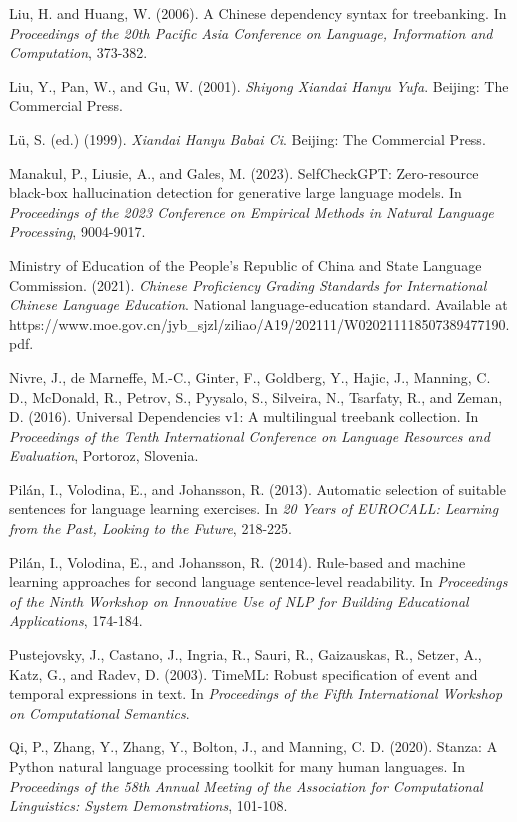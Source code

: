 \documentclass{CUP-JNL-NLP}
\begin{document}
Liu, H. and Huang, W. (2006). A Chinese dependency syntax for treebanking. In \emph{Proceedings of the 20th Pacific Asia Conference on Language, Information and Computation}, 373-382.

Liu, Y., Pan, W., and Gu, W. (2001). \emph{Shiyong Xiandai Hanyu Yufa}. Beijing: The Commercial Press.

Lü, S. (ed.) (1999). \emph{Xiandai Hanyu Babai Ci}. Beijing: The Commercial Press.

Manakul, P., Liusie, A., and Gales, M. (2023). SelfCheckGPT: Zero-resource black-box hallucination detection for generative large language models. In \emph{Proceedings of the 2023 Conference on Empirical Methods in Natural Language Processing}, 9004-9017.

Ministry of Education of the People's Republic of China and State Language Commission. (2021). \emph{Chinese Proficiency Grading Standards for International Chinese Language Education}. National language-education standard. Available at https://www.moe.gov.cn/jyb\_sjzl/ziliao/A19/202111/W020211118507389477190.pdf.

Nivre, J., de Marneffe, M.-C., Ginter, F., Goldberg, Y., Hajic, J., Manning, C. D., McDonald, R., Petrov, S., Pyysalo, S., Silveira, N., Tsarfaty, R., and Zeman, D. (2016). Universal Dependencies v1: A multilingual treebank collection. In \emph{Proceedings of the Tenth International Conference on Language Resources and Evaluation}, Portoroz, Slovenia.

Pilán, I., Volodina, E., and Johansson, R. (2013). Automatic selection of suitable sentences for language learning exercises. In \emph{20 Years of EUROCALL: Learning from the Past, Looking to the Future}, 218-225.

Pilán, I., Volodina, E., and Johansson, R. (2014). Rule-based and machine learning approaches for second language sentence-level readability. In \emph{Proceedings of the Ninth Workshop on Innovative Use of NLP for Building Educational Applications}, 174-184.

Pustejovsky, J., Castano, J., Ingria, R., Sauri, R., Gaizauskas, R., Setzer, A., Katz, G., and Radev, D. (2003). TimeML: Robust specification of event and temporal expressions in text. In \emph{Proceedings of the Fifth International Workshop on Computational Semantics}.

Qi, P., Zhang, Y., Zhang, Y., Bolton, J., and Manning, C. D. (2020). Stanza: A Python natural language processing toolkit for many human languages. In \emph{Proceedings of the 58th Annual Meeting of the Association for Computational Linguistics: System Demonstrations}, 101-108.
\end{document}
